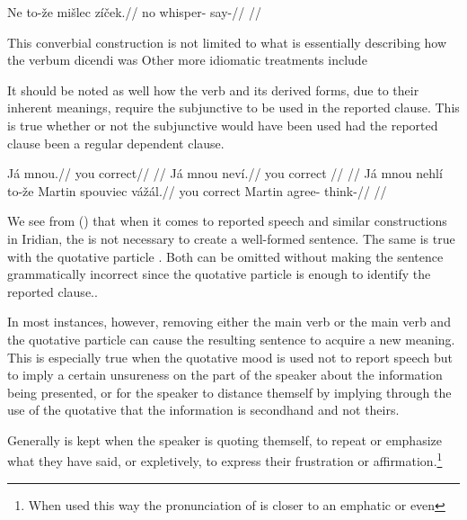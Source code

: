 \pex
\begingl
\gla Ne to-\v{z}e mi\v{s}lec z\'i\v{c}ek.//
\glb no  whisper- say-//
\glft {}//
\endgl
\xe


This converbial construction is not limited to what is essentially describing how the verbum dicendi was  Other more idiomatic treatments include


It should be noted as well how the verb  and its derived forms, due to their inherent meanings, require the subjunctive to be used in the reported clause. This is true whether or not the subjunctive would have been used had the reported clause been a regular dependent clause.


\pex
\a
\begingl
  \gla Já mnou.//
  \glb you correct//
  \glft {}//
\endgl
\a
\begingl
  \gla Já mnou nev\'i.//
  \glb you correct //
  \glft {}//
\endgl
\a
\begingl
  \gla Já mnou nehl\'i to-\v{z}e Martin spouviec v\'a\v{z}\'al.//
  \glb you correct   Martin agree- think-//
  \glft {}//
\endgl
\xe



We see from () that when it comes to reported speech and similar constructions in Iridian, the  is not necessary to create a well-formed sentence. The same is true with the quotative particle . Both can be omitted without making the sentence grammatically incorrect since the quotative particle is enough to identify the reported clause..

In most instances, however, removing either the main verb or the main verb and the quotative particle can cause the resulting sentence to acquire a new meaning. This is especially true when the quotative mood is used not to report speech but to imply a certain unsureness on the part of the speaker about the information being presented, or for the speaker to distance themself by implying through the use of the quotative that the information is secondhand and not theirs.

Generally  is kept when the speaker is quoting themself, to repeat or emphasize what they have said, or expletively, to express their frustration or affirmation.\footnote{When used this way the pronunciation of  is closer to an emphatic  or even }

